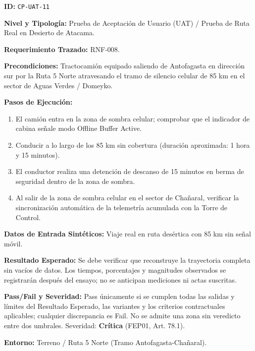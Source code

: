 \par\noindent\textbf{ID:} \texttt{C\allowbreak{}P\allowbreak{}-\allowbreak{}U\allowbreak{}A\allowbreak{}T\allowbreak{}-\allowbreak{}1\allowbreak{}1\allowbreak{}}\par
\par\noindent\textbf{Nivel y Tipología:} Prueba de Aceptación de Usuario (UAT) / Prueba de Ruta Real en Desierto de Atacama.\par
\par\noindent\textbf{Requerimiento Trazado:} RNF-008.\par
\par\noindent\textbf{Precondiciones:} Tractocamión equipado saliendo de Antofagasta en dirección sur por la Ruta 5 Norte atravesando el tramo de silencio celular de 85 km en el sector de Aguas Verdes / Domeyko.\par
\par\noindent\textbf{Pasos de Ejecución:} \par
\begin{enumerate}
\item El camión entra en la zona de sombra celular; comprobar que el indicador de cabina señale modo Offline Buffer Active.
\item Conducir a lo largo de los 85 km sin cobertura (duración aproximada: 1 hora y 15 minutos).
\item El conductor realiza una detención de descanso de 15 minutos en berma de seguridad dentro de la zona de sombra.
\item Al salir de la zona de sombra celular en el sector de Chañaral, verificar la sincronización automática de la telemetría acumulada con la Torre de Control.
\end{enumerate}
\par\noindent\textbf{Datos de Entrada Sintéticos:} Viaje real en ruta desértica con 85 km sin señal móvil.\par
\par\noindent\textbf{Resultado Esperado:} Se debe verificar que reconstruye la trayectoria completa sin vacíos de datos. Los tiempos, porcentajes y magnitudes observados se registrarán después del ensayo; no se anticipan mediciones ni actas suscritas.\par
\par\noindent\textbf{Pass/Fail y Severidad:} Pass únicamente si se cumplen todas las salidas y límites del Resultado Esperado, las variantes y los criterios contractuales aplicables; cualquier discrepancia es Fail. No se admite una zona sin veredicto entre dos umbrales. Severidad: \textbf{Crítica} (FEP01, Art. 78.1).\par
\par\noindent\textbf{Entorno:} Terreno / Ruta 5 Norte (Tramo Antofagasta-Chañaral).\par






